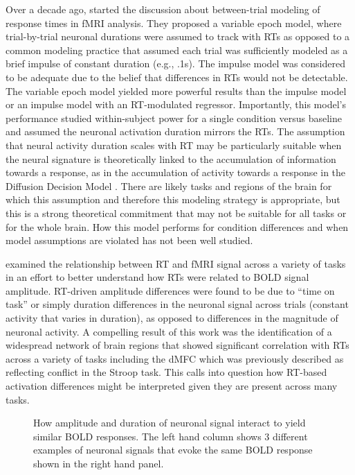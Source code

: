 \documentclass[sn-mathphys,Numbered, super, referee, lineno]{sn-jnl}
\begin{document}
Over a decade ago,  \citet{grinband_detection_2008} started the discussion about between-trial modeling of response times in fMRI analysis.  They proposed a variable epoch model, where trial-by-trial neuronal durations were assumed to track with RTs as opposed to a common modeling practice that assumed each trial was sufficiently modeled as a brief impulse of constant duration (e.g., .1s).  The impulse model was  considered to be adequate due to the belief that differences in RTs would not be detectable. The variable epoch model yielded more powerful results than the impulse model or an impulse model with an RT-modulated regressor.  Importantly, this model's performance studied within-subject power for a single condition versus baseline and assumed the neuronal activation duration mirrors the RTs.  The assumption that neural activity duration scales with RT may be particularly suitable when the neural signature is theoretically linked to the accumulation of information towards a response, as in the accumulation of activity towards a response in the Diffusion Decision Model \citep{ratcliff1978}. There are likely tasks and regions of the brain for which this assumption and therefore this modeling strategy is appropriate, but this is a strong theoretical commitment that may not be suitable for all tasks or for the whole brain. How this model performs for condition differences and when model assumptions are violated has not been well studied.   

\citet{yarkoni_bold_2009} examined the relationship between RT and fMRI signal across a variety of tasks in an effort to better understand how RTs were related to BOLD signal amplitude.  RT-driven amplitude differences were found to be due to ``time on task'' or simply duration differences in the neuronal signal across trials (constant activity that varies in duration), as opposed to differences in the magnitude of neuronal activity.    A compelling result of this work was the identification of a widespread network of brain regions that showed significant correlation with RTs across  a variety of  tasks including the dMFC which was previously described as reflecting conflict in the Stroop task.  This calls into question how RT-based activation differences might be interpreted given they are present across many tasks.

\begin{figure}[!ht]
  \centering
   \caption{How amplitude and duration of neuronal signal interact to yield similar BOLD responses.  The left hand column shows 3 different examples of neuronal signals that evoke the same BOLD response shown in the right hand panel.}
  \label{fig:neuron_bold}
\end{figure}
\end{document}
